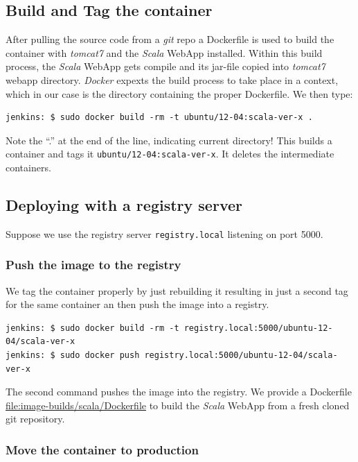 \documentclass[captions=tableheading]{article}
\begin{document}
\subsection{Build and Tag the container}
\label{sec-6-1}

After pulling the source code from a \emph{git} repo a Dockerfile is used to build the container with \emph{tomcat7} and the \emph{Scala} WebApp installed. Within this build process, the \emph{Scala} WebApp gets  compile and its jar-file copied into \emph{tomcat7} webapp directory. \emph{Docker} expexts the build process to take place in a context, which in our case is the directory containing the proper Dockerfile. We then type:

\begin{verbatim}
jenkins: $ sudo docker build -rm -t ubuntu/12-04:scala-ver-x .
\end{verbatim}
Note the ``.'' at the end of the line, indicating current directory! This builds a container and tags it \texttt{ubuntu/12-04:scala-ver-x}. It deletes the intermediate containers.
\subsection{Deploying with a registry server}
\label{sec-6-2}

Suppose we use the registry server \texttt{registry.local} listening on port 5000.
\subsubsection{Push the image to the registry}
\label{sec-6-2-1}

We tag the container properly by just rebuilding it resulting in just a second tag for the same container an then push the image into a registry.

\begin{verbatim}
jenkins: $ sudo docker build -rm -t registry.local:5000/ubuntu-12-04/scala-ver-x
jenkins: $ sudo docker push registry.local:5000/ubuntu-12-04/scala-ver-x
\end{verbatim}
The second command pushes the image into the registry. We provide a Dockerfile  \hyperref[Dockerfile]{file:image-builds/scala/Dockerfile} to build the \emph{Scala} WebApp from a fresh cloned git repository.
\subsubsection{Move the container to production}
\label{sec-6-2-2}
\end{document}
